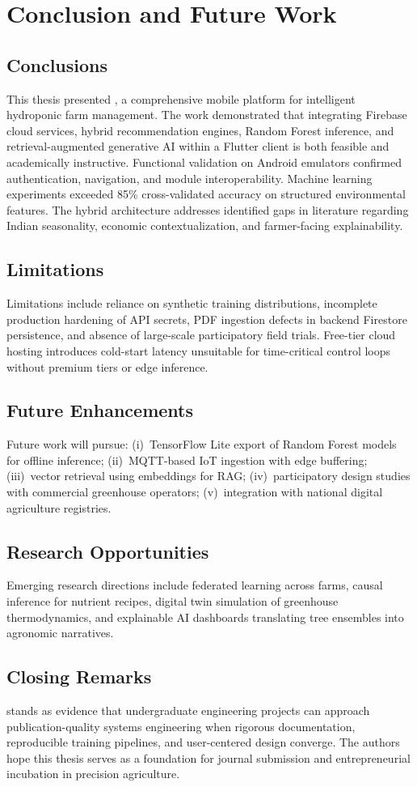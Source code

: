 \chapter{Conclusion and Future Work}
\label{ch:conclusion}

\section{Conclusions}
This thesis presented \HydroSmart, a comprehensive mobile platform for intelligent hydroponic farm management. The work demonstrated that integrating Firebase cloud services, hybrid recommendation engines, Random Forest inference, and retrieval-augmented generative AI within a Flutter client is both feasible and academically instructive. Functional validation on Android emulators confirmed authentication, navigation, and module interoperability. Machine learning experiments exceeded 85\% cross-validated accuracy on structured environmental features. The hybrid architecture addresses identified gaps in literature regarding Indian seasonality, economic contextualization, and farmer-facing explainability.

\section{Limitations}
Limitations include reliance on synthetic training distributions, incomplete production hardening of API secrets, PDF ingestion defects in backend Firestore persistence, and absence of large-scale participatory field trials. Free-tier cloud hosting introduces cold-start latency unsuitable for time-critical control loops without premium tiers or edge inference.

\section{Future Enhancements}
Future work will pursue: (i)~TensorFlow Lite export of Random Forest models for offline inference; (ii)~MQTT-based IoT ingestion with edge buffering; (iii)~vector retrieval using embeddings for RAG; (iv)~participatory design studies with commercial greenhouse operators; (v)~integration with national digital agriculture registries.

\section{Research Opportunities}
Emerging research directions include federated learning across farms, causal inference for nutrient recipes, digital twin simulation of greenhouse thermodynamics, and explainable AI dashboards translating tree ensembles into agronomic narratives.

\section{Closing Remarks}
\HydroSmart{} stands as evidence that undergraduate engineering projects can approach publication-quality systems engineering when rigorous documentation, reproducible training pipelines, and user-centered design converge. The authors hope this thesis serves as a foundation for journal submission and entrepreneurial incubation in precision agriculture.
